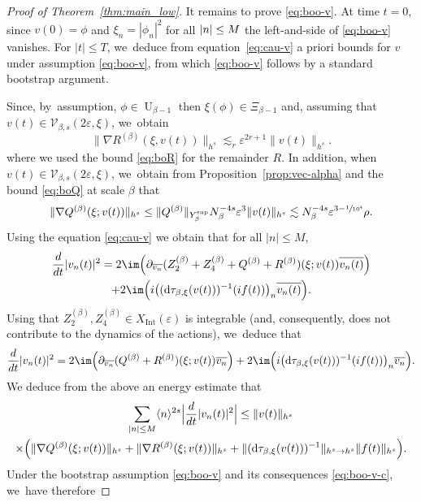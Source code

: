 \documentclass[10pt,a4paper]{amsart}
\theoremstyle{plain}
\theoremstyle{definition}
\newcommand{\1}{\mathbf{1}}
\newcommand{\Ysup}[1]{Y_{#1}^{\mathrm{sup}}}
\let\epsilon\varepsilon
\begin{document}
\begin{proof}[Proof of Theorem~\ref{thm:main_low}]
It remains to prove \eqref{eq:boo-v}. At time $t=0$, since $v(0)=\phi$ and $\xi_{n}=|\phi_{n}|^{2}$ for all $|n|\leq\nobreak M$ the left-and-side of \eqref{eq:boo-v} vanishes. For $|t|\leq T$, we~deduce from equation~\eqref{eq:cau-v} a priori bounds for $v$ under assumption \eqref{eq:boo-v}, from which \eqref{eq:boo-v} follows by a standard bootstrap argument.

Since, by~assumption, $\phi\in\operatorname{U}_{\beta-1}$ then $\xi(\phi)\in\Xi_{\beta-1}$ and, assuming that $v(t)\in\mathcal{V}_{\beta,s}(2\epsilon,\xi)$, we~obtain
\[
\|\nabla R^{(\beta)}(\xi,v(t))\|_{h^{s}}\lesssim_{r}\epsilon^{2r+1}\|v(t)\|_{h^{s}}.
\]
where we used the bound \eqref{eq:boR} for the remainder $R$.
In addition, when $v(t)\in\mathcal{V}_{\beta,s}(2\epsilon,\xi)$, we~obtain from Proposition~\ref{prop:vec-alpha} and the bound \eqref{eq:boQ} at scale $\beta$ that
\begin{equation}
\label{eq:jeveuxteciterdanslintro}
\|\nabla Q^{(\beta)}(\xi;v(t))\|_{h^{s}} \leq \|Q^{(\beta)}\|_{\Ysup{\beta}}N_{\beta}^{-4s}\epsilon^{3}\|v(t)\|_{h^{s}}
\lesssim N_{\beta}^{-4s}\epsilon^{3-\sfrac{1}{10^{4}}}\rho.
\end{equation}
Using the equation \eqref{eq:cau-v} we obtain that for all $|n|\leq M$,
\begin{multline*}
\frac{d}{dt}|v_{n}(t)|^{2}
= 2\im
\Big(
\partial_{\overline{v_{n}}}(Z_{2}^{(\beta)}+Z_{4}^{(\beta)}+Q^{(\beta)}+R^{(\beta)})(\xi;v(t))\overline{v_{n}(t)}
\Big) \\
+
2\im
\Big(i
\big((\mathrm{d}\tau_{\beta,\xi}(v(t)))^{-1}(if(t))\big)_{n}\overline{v_{n}(t)}
\Big).
\end{multline*}
Using that $Z_{2}^{(\beta)},Z_{4}^{(\beta)}\in X_{\mathrm{Int}}(\epsilon)$ is integrable (and, consequently, does not contribute to the dynamics of the actions), we~deduce that
\[
\frac{d}{dt}|v_{n}(t)|^{2} =2\im
\Big(
\partial_{\overline{v_{n}}}(Q^{(\beta)}+R^{(\beta)})(\xi;v(t))\overline{v_{n}}
\Big)
+
2\im
\Big(i\big(\mathrm{d}\tau_{\beta,\xi}(v(t)))^{-1}(if(t))\big)_{n}\overline{v_{n}}
\Big).
\]
We deduce from the above an energy estimate that
\begin{multline*}
\sum_{|n|\leq M}\langle n\rangle^{2s}\Bigl|\frac{d}{dt}|v_{n}(t)|^{2}\Bigr| \leq \|v(t)\|_{h^{s}}
\\
\times\Big(
\|\nabla Q^{(\beta)}(\xi;v(t))\|_{h^{s}}
+
\|\nabla R^{(\beta)}(\xi;v(t))\|_{h^{s}}
+
\|(\mathrm{d}\tau_{\beta,\xi}(v(t)))^{-1}\|_{h^{s}\to h^{s}}\|f(t)\|_{h^{s}}
\Big).
\end{multline*}
Under the bootstrap assumption \eqref{eq:boo-v} and its consequences \eqref{eq:boo-v-c}, we~have therefore

\end{proof}
\end{document}
